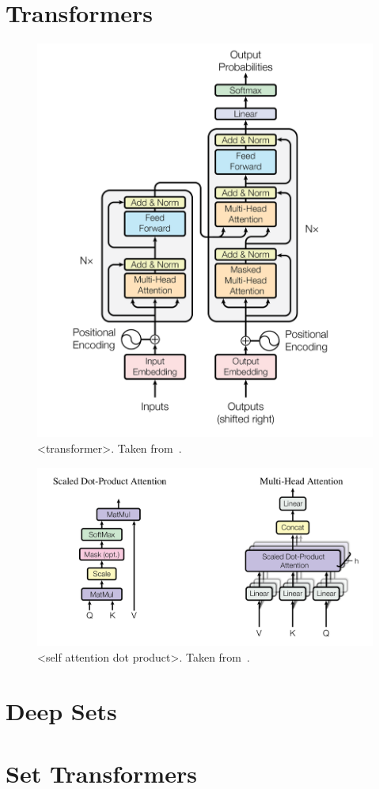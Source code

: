 \section{Transformers}

\begin{figure}[htbp]
    \centering
    \includegraphics[width=0.7\linewidth]{Images/ML/transformer.png}
    \caption{<transformer>. Taken from~\cite{transformer}.}
    \label{fig:transformer}
\end{figure}

\begin{figure}[htbp]
    \centering
    \includegraphics[width=\linewidth]{Images/ML/transformer_dot_product_attention.png}
    \caption{<self attention dot product>. Taken from~\cite{transformer}.}
    \label{fig:transformer_dot_product_attention}
\end{figure}

\section{Deep Sets}

\section {Set Transformers}